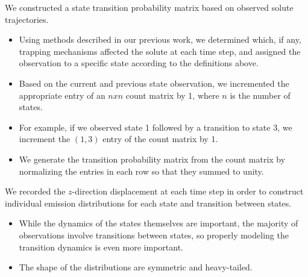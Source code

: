 \documentclass{article}
\begin{document}
  
  \noindent We constructed a state transition probability matrix based on observed solute
  trajectories.
  \begin{itemize}
    \item Using methods described in our previous work, we determined 	
    which, if any, trapping mechanisms affected the solute at each time step, and
    assigned the observation to a specific state according to the definitions 
    above.~\cite{coscia_chemically_2019}
    \item Based on the current and previous state observation, we incremented the
    appropriate entry of an $n x n$ count matrix by 1, where $n$ is the number of states.
    \item For example, if we observed state 1 followed by a transition to state 3,
    we increment the $(1, 3)$ entry of the count matrix by 1.
    \item We generate the transition probability matrix from the count matrix by 
    normalizing the entries in each row so that they summed to unity.
  \end{itemize}
  
  \noindent We recorded the $z$-direction displacement at each time step in order to construct
  individual emission distributions for each state and transition between states.
  \begin{itemize}
    \item While the dynamics of the states themselves are important, the 
    majority of observations involve transitions between states, so properly modeling
    the transition dynamics is even more important.
    \item The shape of the distributions are symmetric and heavy-tailed. 
  \end{itemize}
  
\end{document}
